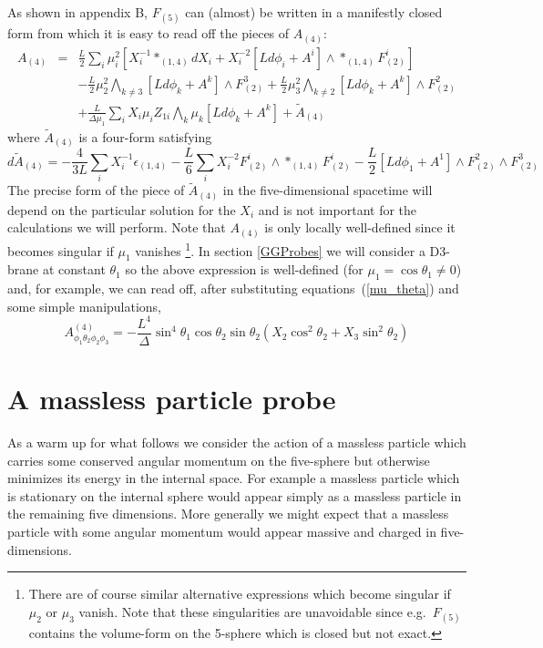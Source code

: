 \documentclass[a4paper,12pt]{article}
\begin{document}
As shown in appendix B, $F_{(5)}$ can (almost) be written in a manifestly closed form
from which it is easy to read off the pieces of $A_{(4)}$:
\begin{eqnarray}
 A_{(4)} & = & \frac{L}{2} \sum_i \mu_i^2 \left[ X_i^{-1} *_{(1,4)} d X_i + X_i^{-2} [Ld\phi_i + A^i] \wedge  *_{(1,4)} F^i_{(2)} \right] \nonumber \\
 & & -\frac{L}{2}\mu_2^2 \bigwedge_{k \ne 3} [L d \phi_k + A^k] \wedge F^3_{(2)} +\frac{L}{2}\mu_3^2 \bigwedge_{k \ne 2} [L d \phi_k + A^k] \wedge F^2_{(2)} \nonumber \\
 & & +\frac{L}{\Delta \mu_1}\sum_i X_i \mu_i Z_{1i} \bigwedge_k \mu_k [L d \phi_k + A^k] + \tilde{A}_{(4)}
\label{eq:A4}
\end{eqnarray}
where $\tilde{A}_{(4)}$ is a four-form satisfying
\begin{equation}
d \tilde{A}_{(4)} = - \frac{4}{3L} \sum_i X_i^{-1} \epsilon_{(1,4)}
	- \frac{L}{6}\sum_i X_i^{-2} F^i_{(2)} \wedge  *_{(1,4)} F^i_{(2)}
	- \frac{L}{2} [Ld\phi_1 + A^1] \wedge F^2_{(2)} \wedge F^3_{(2)}
\end{equation}
The precise form of the piece of $\tilde{A}_{(4)}$ in the five-dimensional
spacetime will depend on the particular solution for the $X_i$ and is not
important for the calculations we will perform. Note that $A_{(4)}$ is only
locally well-defined since it becomes singular if $\mu_1$ vanishes
\footnote{There are of course similar alternative expressions which become
singular if $\mu_2$ or $\mu_3$ vanish. Note that these singularities are
unavoidable since e.g.\ $F_{(5)}$ contains the volume-form
on the 5-sphere which is closed but not exact.}.
In section \ref{GGProbes} we will consider a D3-brane at constant
$\theta_1$ so the above expression is well-defined
(for $ \mu_1 = \cos \theta_1 \ne 0$) and, for example, we can read off, after
substituting equations~(\ref{mu_theta}) and some simple manipulations,
\begin{equation}
A^{(4)}_{\phi_1\theta_2\phi_2\phi_3} =
- \frac{L^4}{\Delta} \sin^4 \theta_1 \cos \theta_2 \sin \theta_2 
\left( X_2 \cos ^2 \theta_2 +  X_3 \sin^2 \theta_2 \right)
\end{equation}

\section{A massless particle probe}

As a warm up for what follows we consider the action of a massless particle which carries some conserved angular momentum on the five-sphere but otherwise minimizes its energy in the internal space. For example a massless particle which is stationary on the internal sphere would appear simply as a massless particle in the remaining five dimensions. More generally we might expect that a massless particle with some angular momentum would appear massive and charged in five-dimensions.
\end{document}

